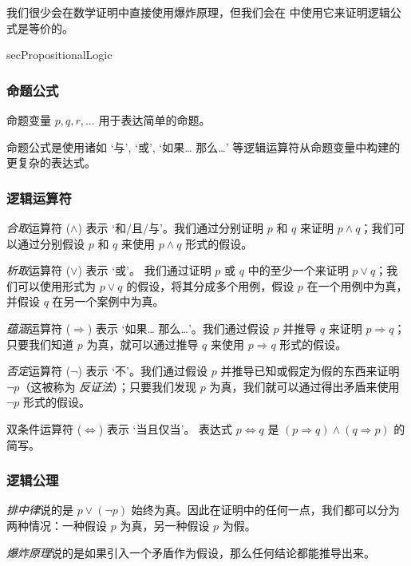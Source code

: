 我们很少会在数学证明中直接使用爆炸原理，但我们会在  中使用它来证明逻辑公式是等价的。

\begin{tldr}{secPropositionalLogic}

\subsubsection*{命题公式}

\begin{tldrlist}
命题变量 $p,q,r,\dots$ 用于表达简单的命题。

命题公式是使用诸如 `与', `或', `如果\dots{} 那么\dots{}' 等逻辑运算符从命题变量中构建的更复杂的表达式。
\end{tldrlist}

\subsubsection*{逻辑运算符}

\begin{tldrlist}
\textit{合取}运算符 ($\wedge$) 表示 `和/且/与'。我们通过分别证明 $p$ 和 $q$ 来证明 $p \wedge q$；我们可以通过分别假设 $p$ 和 $q$ 来使用 $p \wedge q$ 形式的假设。

\textit{析取}运算符 ($\vee$) 表示 `或'。 我们通过证明 $p$ 或 $q$ 中的至少一个来证明 $p \vee q$；我们可以使用形式为 $p \vee q$ 的假设，将其分成多个用例，假设 $p$ 在一个用例中为真，并假设 $q$ 在另一个案例中为真。

\textit{蕴涵}运算符 ($\Rightarrow$) 表示 `如果\dots{} 那么\dots{}'。我们通过假设 $p$ 并推导 $q$ 来证明 $p \Rightarrow q$；只要我们知道 $p$ 为真，就可以通过推导 $q$ 来使用 $p \Rightarrow q$ 形式的假设。

\textit{否定}运算符 ($\neg$) 表示 `不'。我们通过假设 $p$ 并推导已知或假定为假的东西来证明 $\neg p$（这被称为 \textit{反证法}）；只要我们发现 $p$ 为真，我们就可以通过得出矛盾来使用 $\neg p$ 形式的假设。

双条件运算符 ($\Leftrightarrow$) 表示 `当且仅当'。 表达式 $p \Leftrightarrow q$ 是 $(p \Rightarrow q) \wedge (q \Rightarrow p)$ 的简写。
\end{tldrlist}

\subsubsection*{逻辑公理}

\begin{tldrlist}
\textit{排中律}说的是 $p \vee (\neg p)$ 始终为真。因此在证明中的任何一点，我们都可以分为两种情况：一种假设 $p$ 为真，另一种假设 $p$ 为假。

\textit{爆炸原理}说的是如果引入一个矛盾作为假设，那么任何结论都能推导出来。
\end{tldrlist}
\end{tldr}
